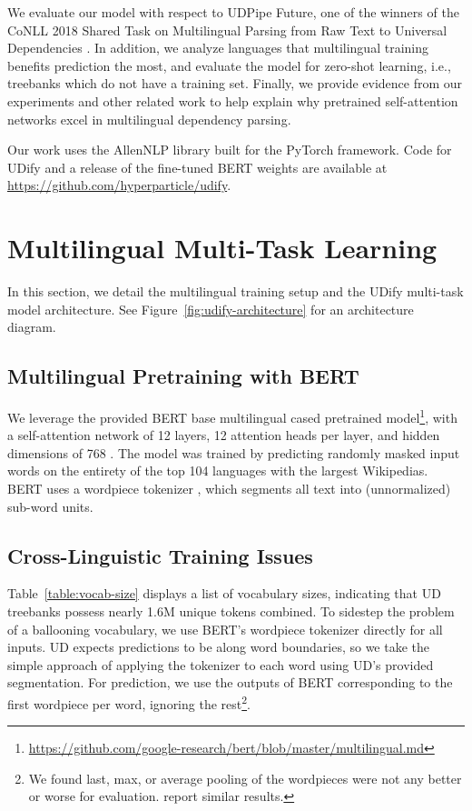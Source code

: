 \documentclass[11pt,a4paper]{article}
\begin{document}
We evaluate our model with respect to UDPipe Future, one of the winners of the CoNLL 2018 Shared Task on Multilingual Parsing from Raw Text to Universal Dependencies \cite{straka:2018:K18-2, zeman-EtAl:2018:K18-2}.
In addition, we analyze languages that multilingual training benefits prediction the most, and evaluate the model for zero-shot learning, i.e., treebanks which do not have a training set.
Finally, we provide evidence from our experiments and other related work to help explain why pretrained self-attention networks excel in multilingual dependency parsing.

Our work uses the AllenNLP library built for the PyTorch framework.
Code for UDify and a release of the fine-tuned BERT weights are available at \url{https://github.com/hyperparticle/udify}.

\section{Multilingual Multi-Task Learning}

In this section, we detail the multilingual training setup and the UDify multi-task model architecture. See Figure~\ref{fig:udify-architecture} for an architecture diagram.

\subsection{Multilingual Pretraining with BERT}

We leverage the provided BERT base multilingual cased pretrained model\footnote{\url{https://github.com/google-research/bert/blob/master/multilingual.md}}, with a self-attention network of 12 layers, 12 attention heads per layer, and hidden dimensions of 768 \cite{devlin2018bert}.
The model was trained by predicting randomly masked input words on the entirety of the top 104 languages with the largest Wikipedias.
BERT uses a wordpiece tokenizer \cite{wu2016google}, which segments all text into (unnormalized) sub-word units.

\subsection{Cross-Linguistic Training Issues}

Table~\ref{table:vocab-size} displays a list of vocabulary sizes, indicating that UD treebanks possess nearly 1.6M unique tokens combined.
To sidestep the problem of a ballooning vocabulary, we use BERT's wordpiece tokenizer directly for all inputs.
UD expects predictions to be along word boundaries, so we take the simple approach of applying the tokenizer to each word using UD's provided segmentation.
For prediction, we use the outputs of BERT corresponding to the first wordpiece per word, ignoring the rest\footnote{We found last, max, or average pooling of the wordpieces were not any better or worse for evaluation.  report similar results.}.
\end{document}
